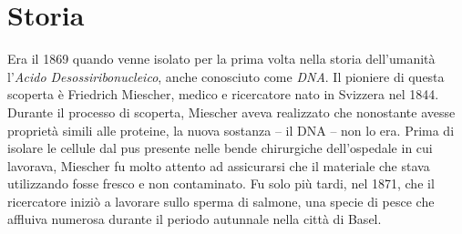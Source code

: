 \section{Storia}

Era il 1869 quando venne isolato per la prima volta nella storia dell'umanità l'\textit{Acido Desossiribonucleico}, anche conosciuto come \textit{DNA}. Il pioniere di questa scoperta è Friedrich Miescher, medico e ricercatore nato in Svizzera nel 1844. Durante il processo di scoperta, Miescher aveva realizzato che nonostante  avesse proprietà simili alle proteine, la nuova sostanza -- il DNA -- non lo era. Prima di isolare le cellule dal pus presente nelle bende chirurgiche dell'ospedale in cui lavorava, Miescher fu molto attento ad assicurarsi che il materiale che stava utilizzando fosse fresco e non contaminato. Fu solo più tardi, nel 1871, che il ricercatore iniziò a lavorare sullo sperma di salmone, una specie di pesce che affluiva numerosa durante il periodo autunnale nella città di Basel.